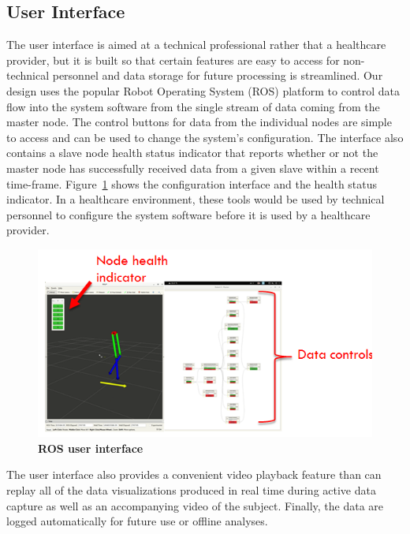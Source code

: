 \documentclass[conference]{IEEEtran}
\begin{document}
\subsection{User Interface}
The user interface is aimed at a technical professional rather that a healthcare provider,
but it is built so that certain features are easy to access for non-technical personnel
and data storage for future processing is streamlined. Our design uses the popular Robot
Operating System (ROS) platform to control data flow into the system software from the
single stream of data coming from the master node. The control buttons for data from the
individual nodes are simple to access and can be used to change the system's
configuration. The interface also contains a slave node health status indicator that
reports whether or not the master node has successfully received data from a given slave
within a recent time-frame. Figure~\ref{fig:ROS} shows the configuration interface and the
health status indicator. In a healthcare environment, these tools would be used by
technical personnel to configure the system software before it is used by a healthcare
provider. 

\begin{figure}[h]
  \centering
  \includegraphics[width=\columnwidth]{figs/gui}
  \caption{{\bf ROS user interface}}
  \label{fig:ROS}
\end{figure}
The user interface also provides a convenient video playback feature than can replay all
of the data visualizations produced in real time during active data capture as well as an
accompanying video of the subject. Finally, the data are logged automatically for future
use or offline analyses. 
\end{document}
